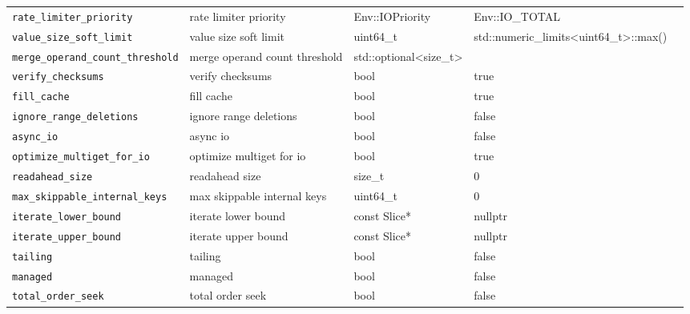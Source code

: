 {{\begin{longtable}{@{}p{3.4cm}p{5.0cm}p{3.6cm}p{2.5cm}p{2.6cm}@{}}
    \texttt{rate\_limiter\_priority}
    & rate limiter priority
    & Env::IOPriority
    & Env::IO\_TOTAL
    & \\

    \texttt{value\_size\_soft\_limit}
    & value size soft limit
    & uint64\_t
    & std::numeric\_limits\textless{}uint64\_t\textgreater{}::max()
    & \\

    \texttt{merge\_operand\_count\_threshold}
    & merge operand count threshold
    & std::optional\textless{}size\_t\textgreater{}
    & 
    & \\

    \texttt{verify\_checksums}
    & verify checksums
    & bool
    & true
    & \\

    \texttt{fill\_cache}
    & fill cache
    & bool
    & true
    & \\

    \texttt{ignore\_range\_deletions}
    & ignore range deletions
    & bool
    & false
    & \\

    \texttt{async\_io}
    & async io
    & bool
    & false
    & \\

    \texttt{optimize\_multiget\_for\_io}
    & optimize multiget for io
    & bool
    & true
    & \\

    \texttt{readahead\_size}
    & readahead size
    & size\_t
    & 0
    & \\

    \texttt{max\_skippable\_internal\_keys}
    & max skippable internal keys
    & uint64\_t
    & 0
    & \\

    \texttt{iterate\_lower\_bound}
    & iterate lower bound
    & const Slice*
    & nullptr
    & \\

    \texttt{iterate\_upper\_bound}
    & iterate upper bound
    & const Slice*
    & nullptr
    & \\

    \texttt{tailing}
    & tailing
    & bool
    & false
    & \\

    \texttt{managed}
    & managed
    & bool
    & false
    & \\

    \texttt{total\_order\_seek}
    & total order seek
    & bool
    & false
    & \\


\end{longtable}}}
